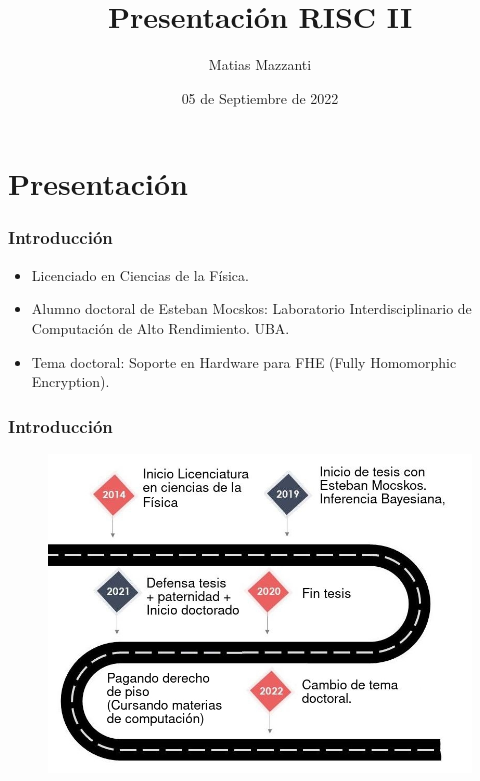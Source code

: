 \documentclass[handout]{beamer}
\title[RISC II]{Presentación RISC II}
\author[Matias Mazzanti]{Matias Mazzanti}
\institute{DC-UBA}
\date{05 de Septiembre de 2022}
\begin{document}
\begin{frame}

\maketitle

\end{frame}


\section{Presentaci\'on}
\begin{frame}
\frametitle{Introducción}

\begin{itemize}
  \item Licenciado en Ciencias de la Física.
  \item Alumno doctoral de Esteban Mocskos: Laboratorio Interdisciplinario de Computación de Alto Rendimiento. UBA.
  \item Tema doctoral: Soporte en Hardware para FHE (Fully Homomorphic Encryption).
\end{itemize}

\end{frame}



\begin{frame}
\frametitle{Introducción}
\begin{figure}[h!]
    \centering
    \includegraphics[scale=0.3]{road.jpg}
\end{figure}
\end{frame}
\end{document}
